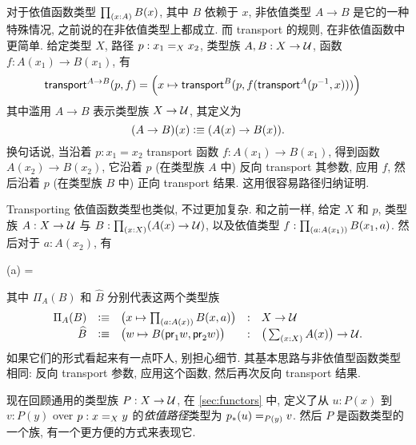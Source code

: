 对于依值函数类型 $\prd{x:A} B(x)$, 其中 $B$ 依赖于 $x$, 非依值类型 $A\to B$ 是它的一种特殊情况, 之前说的在非依值类型上都成立.
%
而 transport 的规则, 在非依值函数中更简单.
给定类型 $X$, 路径 $p:\id[X]{x_1}{x_2}$, 类型族 $A,B:X\to \type$, 函数 $f : A(x_1) \to B(x_1)$, 有
\begin{align}
  \label{eq:transport-arrow}
  \transfib{A\to B}{p}{f} &=
  \Big(x \mapsto \transfib{B}{p}{f(\transfib{A}{\opp p}{x})}\Big)
\end{align}
其中滥用 $A\to B$ 表示类型族 $X\to \type$, 其定义为
\[
  (A\to B)(x) \defeq (A(x)\to B(x)).
\]
换句话说, 当沿着 $p:x_1=x_2$ transport 函数 $f:A(x_1)\to B(x_1)$, 得到函数 $A(x_2)\to B(x_2)$, 它沿着 $p$ (在类型族 $A$ 中) 反向 transport 其参数, 应用 $f$, 然后沿着 $p$ (在类型族 $B$ 中) 正向 transport 结果.
这用很容易路径归纳证明.

%
Transporting 依值函数类型也类似, 不过更加复杂.
和之前一样, 给定 $X$ 和 $p$, 类型族 $A:X\to \type$ 与 $B:\prd{x:X} (A(x)\to\type)$, 以及依值类型 $f : \prd{a:A(x_1)} B(x_1,a)$.
然后对于 $a:A(x_2)$, 有
\begin{narrowmultline*}
  (a) = \narrowbreak
\end{narrowmultline*}
其中 $\Pi_A(B)$ 和 $\widehat{B}$ 分别代表这两个类型族
\begin{equation}\label{eq:transport-arrow-families}
\begin{array}{rclcl}
\Pi_A(B) &\defeq& \big(x\mapsto \prd{a:A(x)} B(x,a) \big) &:& X\to \type\\
\widehat{B} &\defeq& \big(w \mapsto B(\proj1w,\proj2w) \big) &:& \big(\sm{x:X} A(x)\big) \to \type.
\end{array}
\end{equation}
如果它们的形式看起来有一点吓人, 别担心细节.
其基本思路与非依值型函数类型相同: 反向 transport 参数, 应用这个函数, 然后再次反向 transport 结果.

现在回顾通用的类型族 $P:X\to\type$, 在 \cref{sec:functors} 中, 定义了从 $u:P(x)$ 到 $v:P(y)$ over $p:\id[X]xy$ 的\emph{依值路径}类型为 $\id[P(y)]{\trans{p}{u}}{v}$.
然后 $P$ 是函数类型的一个族, 有一个更方便的方式来表现它.


